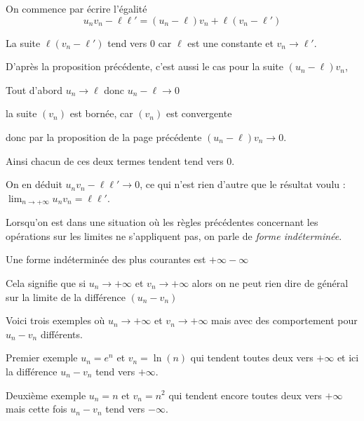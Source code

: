 \change

On commence par écrire l'égalité 
  \[
    u_nv_n-\ell\ell'=(u_n-\ell)v_n+\ell(v_n-\ell')
  \]

  \change

  La suite $\ell(v_n-\ell')$ tend vers $0$ car $\ell$ est une constante et $v_n\to \ell'$. 

  \change

  D'après la proposition précédente, c'est aussi le cas pour la suite $(u_n-\ell)v_n$, 

  \change
   
   Tout d'abord $u_n \to \ell$ donc $u_n-\ell \to 0$
   
   \change
   
 la suite $(v_n)$ est bornée, car $(v_n)$ est convergente
 
 \change
 
 donc par la proposition de la page précédente $(u_n-\ell)v_n \to 0$.

\change

Ainsi chacun de ces deux termes tendent tend vers $0$.

On en déduit $u_nv_n-\ell\ell' \to 0$, 
ce qui n'est rien d'autre que le résultat voulu :  $\lim_{n\to +\infty} u_nv_n=\ell\ell'$.


 \diapo

Lorsqu'on est dans une situation où les règles précédentes 
concernant les opérations sur les limites ne s'appliquent pas, 
on parle de \emph{forme indéterminée}.

\change

Une forme indéterminée des plus courantes est \og{}$+\infty-\infty$\fg{} 


Cela signifie que si $u_n \to + \infty$ et $v_n \to + \infty$
alors on ne peut rien dire de général sur la limite de la différence 
$(u_n-v_n)$

Voici trois exemples où $u_n \to + \infty$ et $v_n \to + \infty$
mais avec des comportement pour $u_n-v_n$ différents.

\change

Premier exemple $u_n = e^n$  et $v_n=\ln(n)$ qui tendent toutes deux vers $+\infty$
et ici la différence $u_n-v_n$ tend vers $+\infty$.

\change

Deuxième exemple $u_n = n$  et $v_n=n^2$ qui tendent encore toutes deux vers $+\infty$
mais cette fois $u_n-v_n$ tend vers $-\infty$.

